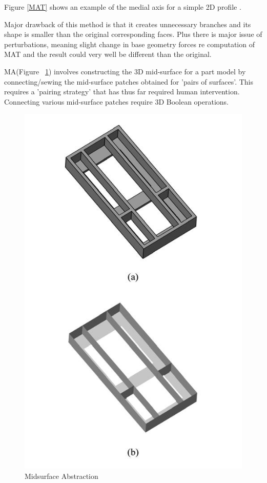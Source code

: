 \documentclass[a4paper]{article}
\begin{document}
Figure \ref{MAT} shows an example of the medial axis for a simple 2D profile \cite{Sheen2007}. 

Major drawback of this method is that it creates unnecessary branches and its shape is smaller than the original corresponding faces. Plus there is major issue of perturbations, meaning slight change in base geometry forces re computation of MAT and the result could very well be different than the original. 

MA(Figure ~\ref{MIDSURFRAM}) involves constructing the 3D mid-surface for a part model by connecting/sewing the mid-surface patches obtained for 'pairs of surfaces'. This requires a 'pairing strategy' that has thus far required human intervention. Connecting various mid-surface patches require 3D Boolean operations. 

\begin{figure}
\includegraphics[scale=0.4]{../Common/images//MIDSURF.jpg}
\caption{Midsurface Abstraction \cite{Ramanathan}}
\label{MIDSURFRAM}
\end{figure}
\end{document}
